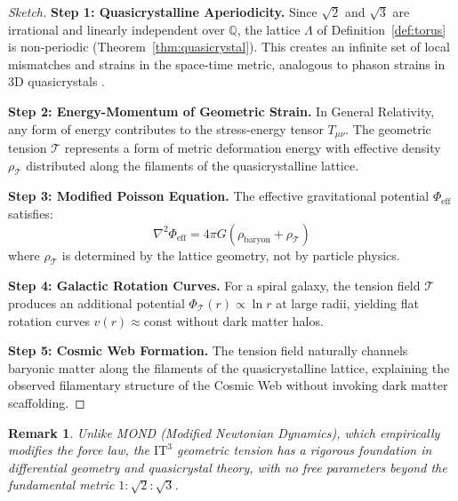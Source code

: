 \documentclass[12pt,a4paper,oneside]{article}
\newtheorem{remark}[theorem]{Remark}
\newcommand{\ITthree}{\text{IT}^3}
\begin{document}
\begin{proof}[Sketch]
\textbf{Step 1: Quasicrystalline Aperiodicity.} Since $\sqrt{2}$ and $\sqrt{3}$ are irrational and linearly independent over $\mathbb{Q}$, the lattice $\Lambda$ of Definition~\ref{def:torus} is non-periodic (Theorem~\ref{thm:quasicrystal}). This creates an infinite set of local mismatches and strains in the space-time metric, analogous to phason strains in 3D quasicrystals \cite{Steinhardt1987, Janot1994}.

\textbf{Step 2: Energy-Momentum of Geometric Strain.} In General Relativity, any form of energy contributes to the stress-energy tensor $T_{\mu\nu}$. The geometric tension $\mathcal{T}$ represents a form of metric deformation energy with effective density $\rho_{\mathcal{T}}$ distributed along the filaments of the quasicrystalline lattice.

\textbf{Step 3: Modified Poisson Equation.} The effective gravitational potential $\Phi_{\text{eff}}$ satisfies:
\begin{equation}
    \nabla^2 \Phi_{\text{eff}} = 4\pi G (\rho_{\text{baryon}} + \rho_{\mathcal{T}})
\end{equation}
where $\rho_{\mathcal{T}}$ is determined by the lattice geometry, not by particle physics.

\textbf{Step 4: Galactic Rotation Curves.} For a spiral galaxy, the tension field $\mathcal{T}$ produces an additional potential $\Phi_{\mathcal{T}}(r) \propto \ln r$ at large radii, yielding flat rotation curves $v(r) \approx \text{const}$ without dark matter halos.

\textbf{Step 5: Cosmic Web Formation.} The tension field naturally channels baryonic matter along the filaments of the quasicrystalline lattice, explaining the observed filamentary structure of the Cosmic Web without invoking dark matter scaffolding.
\end{proof}

\begin{remark}
Unlike MOND (Modified Newtonian Dynamics), which empirically modifies the force law, the $\ITthree$ geometric tension has a rigorous foundation in differential geometry and quasicrystal theory, with no free parameters beyond the fundamental metric $1:\sqrt{2}:\sqrt{3}$.
\end{remark}

\end{document}

